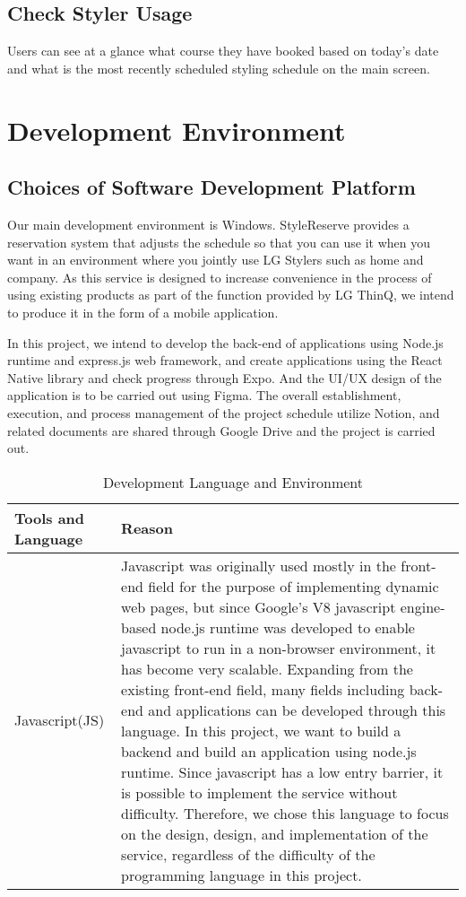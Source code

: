 \documentclass[conference]{IEEEtran}
\begin{document}
\subsection{Check Styler Usage}
Users can see at a glance what course they have booked based on today's date and what is the most recently scheduled styling schedule on the main screen.\\

\section{Development Environment}
\subsection{Choices of Software Development Platform}
Our main development environment is Windows. StyleReserve provides a reservation system that adjusts the schedule so that you can use it when you want in an environment where you jointly use LG Stylers such as home and company. As this service is designed to increase convenience in the process of using existing products as part of the function provided by LG ThinQ, we intend to produce it in the form of a mobile application. 

In this project, we intend to develop the back-end of applications using Node.js runtime and express.js web framework, and create applications using the React Native library and check progress through Expo. And the UI/UX design of the application is to be carried out using Figma. The overall establishment, execution, and process management of the project schedule utilize Notion, and related documents are shared through Google Drive and the project is carried out.

\begin{table}[htbp]
\caption{Development Language and Environment}
\begin{tabular}{| p{1.7cm}|p{6.4cm} |}
    \hline
    Tools and Language & Reason \\
    \hline
    Javascript(JS) & Javascript was originally used mostly in the front-end field for the purpose of implementing dynamic web pages, but since Google's V8 javascript engine-based node.js runtime was developed to enable javascript to run in a non-browser environment, it has become very scalable. Expanding from the existing front-end field, many fields including back-end and applications can be developed through this language.
    In this project, we want to build a backend and build an application using node.js runtime. Since javascript has a low entry barrier, it is possible to implement the service without difficulty. Therefore, we chose this language to focus on the design, design, and implementation of the service, regardless of the difficulty of the programming language in this project.\\
    \hline
\end{tabular}
\end{table}
\end{document}
